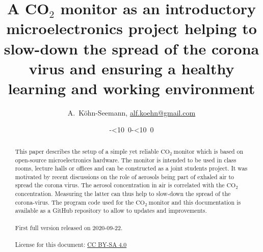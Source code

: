 \documentclass[12pt,a4paper]{article}
\def\myisodate{\leavevmode\hbox{\the\year-\twodigits\month-\twodigits\day}}
\def\twodigits#1{\ifnum#1<10 0\fi\the#1}
\newcommand{\coo}{\ensuremath{\mathrm{CO_2}~}}
\begin{document}
\title{A CO$_2$ monitor as an introductory microelectronics project helping to slow-down the spread of the corona virus and ensuring a healthy learning and working environment}

\author{A.~K\"{o}hn-Seemann, \href{mailto:alf.koehn@gmail.com}{alf.koehn@gmail.com}%
		}
		
\date{\myisodate}


\maketitle

\begin{abstract}
This paper describes the setup of a simple yet reliable \coo monitor which is based on open-source microelectronics hardware. The monitor is intended to be used in class rooms, lecture halls or offices and can be constructed as a joint students project. It was motivated by recent discussions on the role of aerosols being part of exhaled air to spread the corona virus. The aerosol concentration in air is correlated with the \coo concentration. Measuring the latter can thus help to slow-down the spread of the corona-virus. The program code used for the \coo monitor and this documentation is available as a GitHub repository to allow to updates and improvements. 
\\ \quad \\ First full version released on 2020-09-22.
\\ \quad \\ License for this document: \href{https://creativecommons.org/licenses/by-sa/4.0/}{CC BY-SA 4.0}
\end{abstract}


\end{document}
